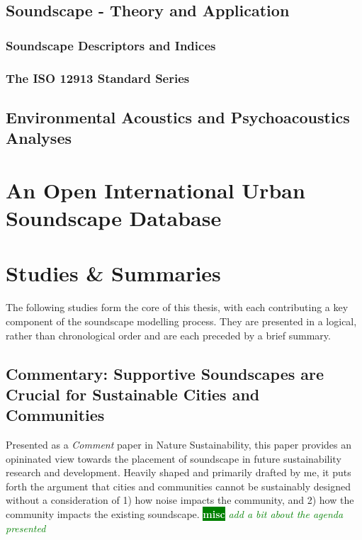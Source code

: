 \documentclass[twoside,fontsize=12pt,titlepage]{scrbook}
\newcommand{\remark}[3]{%
    {\colorbox{#2}{\sffamily\scriptsize\bfseries\textcolor{white}{#1}}}
    {\sffamily\small\itshape\textcolor{#2}{#3}}
}
\newcommand{\misc}[1]{\remark{misc}{green}{#1}}
\begin{document}
\section{Soundscape - Theory and Application}
 \subsection{Soundscape Descriptors and Indices}
       \citep{Aletta2016Soundscape}

 \subsection{The ISO 12913 Standard Series}
\section{Environmental Acoustics and Psychoacoustics Analyses}


 \chapter{An Open International Urban Soundscape Database}



 \chapter{Studies \& Summaries}

 The following studies form the core of this thesis, with each contributing a key component of the soundscape modelling process. They are presented in a logical, rather than chronological order and are each preceded by a brief summary.

 \newpage
\section[Commentary]{Commentary: Supportive Soundscapes are Crucial for Sustainable Cities and Communities}

 Presented as a \textit{Comment} paper in Nature Sustainability, this paper provides an opininated view towards the placement of soundscape in future sustainability research and development. Heavily shaped and primarily drafted by me, it puts forth the argument that cities and communities cannot be sustainably designed without a consideration of 1) how noise impacts the community, and 2) how the community impacts the existing soundscape. \misc{add a bit about the agenda presented}
\end{document}
